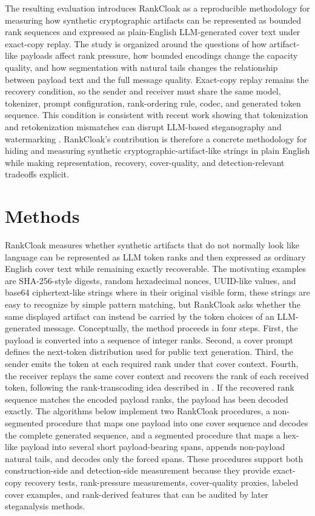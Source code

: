 \documentclass[fleqn,10pt]{wlscirep}
\begin{document}
The resulting evaluation introduces RankCloak as a reproducible methodology for measuring how synthetic cryptographic artifacts can be represented as bounded rank sequences and expressed as plain-English LLM-generated cover text under exact-copy replay. The study is organized around the questions of how artifact-like payloads affect rank pressure, how bounded encodings change the capacity quality, and how segmentation with natural tails changes the relationship between payload text and the full message quality. Exact-copy replay remains the recovery condition, so the sender and receiver must share the same model, tokenizer, prompt configuration, rank-ordering rule, codec, and generated token sequence. This condition is consistent with recent work showing that tokenization and retokenization mismatches can disrupt LLM-based steganography and watermarking \cite{YanMurawaki2025TokenizationInconsistency}. RankCloak's contribution is therefore a concrete methodology for hiding and measuring synthetic cryptographic-artifact-like strings in plain English while making representation, recovery, cover-quality, and detection-relevant tradeoffs explicit.





\section*{Methods}

RankCloak measures whether synthetic artifacts that do not normally look like language can be represented as LLM token ranks and then expressed as ordinary English cover text while remaining exactly recoverable. The motivating examples are SHA-256-style digests, random hexadecimal nonces, UUID-like values, and base64 ciphertext-like strings where in their original visible form, these strings are easy to recognize by simple pattern matching, but RankCloak asks whether the same displayed artifact can instead be carried by the token choices of an LLM-generated message. Conceptually, the method proceeds in four steps. First, the payload is converted into a sequence of integer ranks. Second, a cover prompt defines the next-token distribution used for public text generation. Third, the sender emits the token at each required rank under that cover context. Fourth, the receiver replays the same cover context and recovers the rank of each received token, following the rank-transcoding idea described in \cite{NorelliBronstein2025Calgacus}. If the recovered rank sequence matches the encoded payload ranks, the payload has been decoded exactly. The algorithms below implement two RankCloak procedures, a non-segmented procedure that maps one payload into one cover sequence and decodes the complete generated sequence, and a segmented procedure that maps a hex-like payload into several short payload-bearing spans, appends non-payload natural tails, and decodes only the forced spans. These procedures support both construction-side and detection-side measurement because they provide exact-copy recovery tests, rank-pressure measurements, cover-quality proxies, labeled cover examples, and rank-derived features that can be audited by later steganalysis methods.
\end{document}
